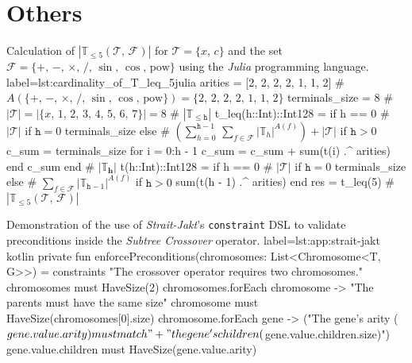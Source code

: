     \section{Others}
        \begin{code}{
            Calculation of \(|\mathbb{T}_{\leq 5}(\mathcal{T},\, \mathcal{F})|\) for 
            \(\mathcal{T} = \{x,\, c\}\) and the set \(\mathcal{F} = \{+,\, -,\, 
            \times,\, /,\, \sin,\, \cos,\, \mathrm{pow}\}\) using the \textit{Julia}
            programming language.
        }{label={lst:cardinality_of_T_leq_5}}{julia}
            arities = [2, 2, 2, 2, 1, 1, 2] # $A\left(\{+,\,-,\,\times,\,/,\,\sin,\,\cos,\,\mathrm{pow}\}\right) = \{2,\,2,\,2,\,2,\,1,\,1,\,2\}$
            terminals_size = 8  # $|\mathcal{T}| = |\{x,\,1,\,2,\,3,\,4,\,5,\,6,\,7\}| = 8$
            # $|\mathbb{T}_{\leq \mathtt{h}}|$
            t_leq(h::Int)::Int128 = if h == 0 # $|\mathcal{T}|$ if $\mathtt{h} = 0$
            terminals_size
            else  # $\left(\sum_{h = 0}^{\mathtt{h} - 1}\,\sum_{f \in \mathcal{F}} |\mathbb{T}_h|^{A(f)}\right)+ |\mathcal{T}|$ if $\mathtt{h} > 0$
            c_sum = terminals_size
            for i = 0:h - 1
                c_sum = c_sum + sum(t(i) .^ arities)
            end
            c_sum
            end
            # $|\mathbb{T}_\mathbf{h}|$
            t(h::Int)::Int128 = if h == 0 # $|\mathcal{T}|$ if $\mathtt{h} = 0$
            terminals_size
            else  # $\sum_{f \in \mathcal{F}} |\mathbb{T}_{\mathtt{h} - 1}|^{A(f)}$ if $\mathtt{h} > 0$
            sum(t(h - 1) .^ arities) 
            end
            res = t_leq(5)  # $|\mathbb{T}_{\leq 5}(\mathcal{T},\, \mathcal{F})|$
        \end{code}

        
        \begin{code}{
            Demonstration of the use of \textit{Strait-Jakt}'s \texttt{constraint} DSL to validate preconditions inside the 
            \textit{Subtree Crossover} operator.
        }{
            label=lst:app:strait-jakt
        }{kotlin}
            private fun enforcePreconditions(chromosomes: List<Chromosome<T, G>>) = constraints {
                "The crossover operator requires two chromosomes." { chromosomes must HaveSize(2) }
                chromosomes.forEach { chromosome ->
                    "The parents must have the same size" { 
                        chromosome must HaveSize(chromosomes[0].size) 
                    }
                    chromosome.forEach { gene ->
                        ("The gene's arity (${gene.value.arity}) must match "
                            + "the gene's children (${gene.value.children.size})") {
                            gene.value.children must HaveSize(gene.value.arity)
                        }
                    }
                }
            }
        \end{code}

